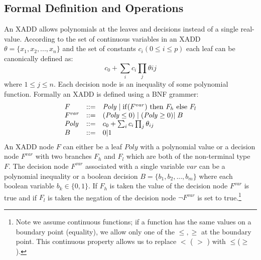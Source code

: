 \documentclass[twoside,11pt]{article}
\begin{document}
\subsection{Formal Definition and Operations}
An XADD allows polynomials at the leaves and decisions instead of a single real-value.  According to the set of continuous variables in an XADD $\theta = \lbrace x_1,x_2,...,x_n\rbrace$ and the set of constants $c_i (0 \leq i \leq p)$ each leaf can be canonically defined as:
\begin{equation}
c_0+\sum_{i} c_i \prod_j \theta{ij}
\nonumber
\end{equation}
where $ 1 \leq j \leq n $. Each decision node is an inequality of some polynomial function. Formally an XADD is defined using a BNF grammer: 
\begin{equation}
\nonumber
\begin{array}{lll}
F&::=&  \mathit{Poly}  \hspace{1mm} \vert  \hspace{1mm} \mathrm{if} (F^{var})\ \mathrm{then}\ F_h\ \mathrm{else}\ F_l \\
F^{var}&::=& ( \mathit{Poly} \leq 0)  \hspace{1mm}\vert \hspace{1mm}
 ( \mathit{Poly} \geq 0) \vert \hspace{1mm} B\\
\mathit{Poly}&::=&c_0+\sum_{i} c_i \prod_j \theta_{ij}\\
B&::=& 0|1
\end{array}
\end{equation}
An XADD node $F$ can either be a leaf $\mathit{Poly}$ with a polynomial value or a decision node $F^{var}$ with two branches $F_h$ and $F_l$ which are both of the non-terminal type $F$. The decision node $F^{var}$ associated with a single variable $var$ can be a polynomial inequality or a boolean decision $B = \lbrace b_1,b_2,...,b_m \rbrace$ where each boolean variable $b_k \in \lbrace 0,1 \rbrace$. If $F_h$ is taken the value of the decision node $F^{var}$ is true and if $F_l$ is taken the negation of the decision node $\neg F^{var}$ is set to true.\footnote {Note we assume continuous functions; if a function has the same values on a boundary point (equality), we allow only one of the $\leq, \geq$ at the boundary point. This continuous property allows us to replace $<$ ( $>$ ) with $\leq$($\geq$).} 
\end{document}
